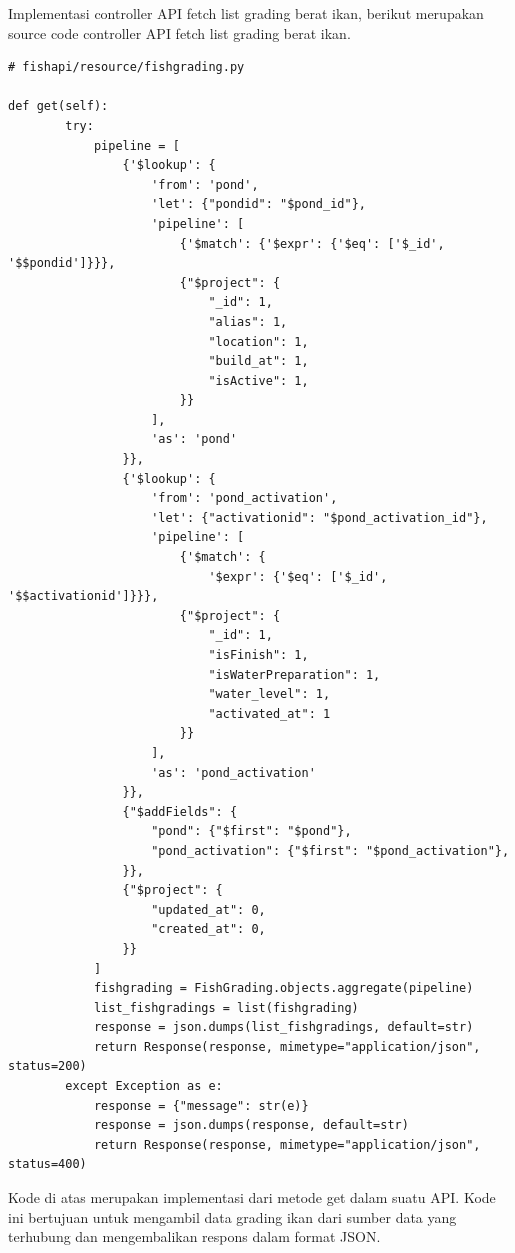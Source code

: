 \begin{enumerate}[1.]
Implementasi controller API fetch list grading berat ikan, berikut merupakan source code controller API fetch list grading berat ikan.

\begin{lstlisting}
# fishapi/resource/fishgrading.py

def get(self):
        try:
            pipeline = [
                {'$lookup': {
                    'from': 'pond',
                    'let': {"pondid": "$pond_id"},
                    'pipeline': [
                        {'$match': {'$expr': {'$eq': ['$_id', '$$pondid']}}},
                        {"$project": {
                            "_id": 1,
                            "alias": 1,
                            "location": 1,
                            "build_at": 1,
                            "isActive": 1,
                        }}
                    ],
                    'as': 'pond'
                }},
                {'$lookup': {
                    'from': 'pond_activation',
                    'let': {"activationid": "$pond_activation_id"},
                    'pipeline': [
                        {'$match': {
                            '$expr': {'$eq': ['$_id', '$$activationid']}}},
                        {"$project": {
                            "_id": 1,
                            "isFinish": 1,
                            "isWaterPreparation": 1,
                            "water_level": 1,
                            "activated_at": 1
                        }}
                    ],
                    'as': 'pond_activation'
                }},
                {"$addFields": {
                    "pond": {"$first": "$pond"},
                    "pond_activation": {"$first": "$pond_activation"},
                }},
                {"$project": {
                    "updated_at": 0,
                    "created_at": 0,
                }}
            ]
            fishgrading = FishGrading.objects.aggregate(pipeline)
            list_fishgradings = list(fishgrading)
            response = json.dumps(list_fishgradings, default=str)
            return Response(response, mimetype="application/json", status=200)
        except Exception as e:
            response = {"message": str(e)}
            response = json.dumps(response, default=str)
            return Response(response, mimetype="application/json", status=400)
\end{lstlisting}



Kode di atas merupakan implementasi dari metode get dalam suatu API. Kode ini bertujuan untuk mengambil data grading ikan dari sumber data yang terhubung dan mengembalikan respons dalam format JSON.


\end{enumerate}
